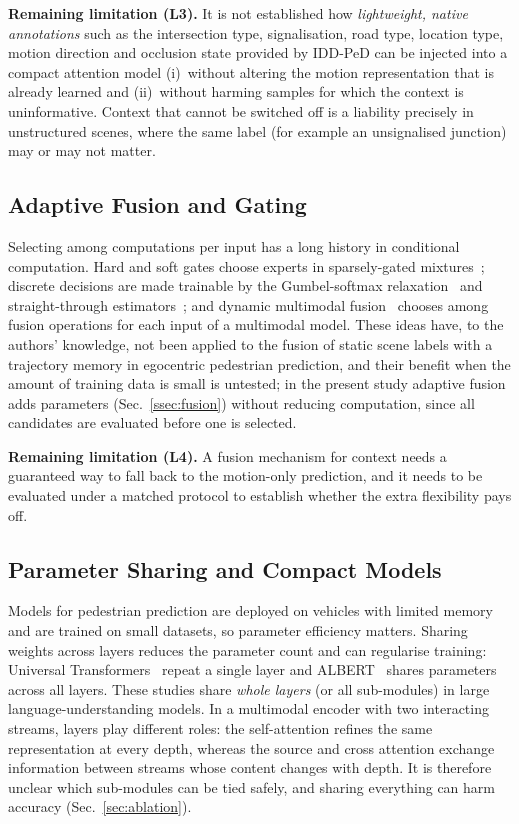 \textbf{Remaining limitation (L3).} It is not established how \emph{lightweight, native annotations} such as the intersection type, signalisation, road type, location type, motion direction and occlusion state provided by IDD-PeD can be injected into a compact attention model (i)~without altering the motion representation that is already learned and (ii)~without harming samples for which the context is uninformative. Context that cannot be switched off is a liability precisely in unstructured scenes, where the same label (for example an unsignalised junction) may or may not matter.

\subsection{Adaptive Fusion and Gating}
Selecting among computations per input has a long history in conditional computation. Hard and soft gates choose experts in sparsely-gated mixtures~\citep{shazeer2017moe}; discrete decisions are made trainable by the Gumbel-softmax relaxation~\citep{jang2017gumbel} and straight-through estimators~\citep{bengio2013ste}; and dynamic multimodal fusion~\citep{xue2022dynmm} chooses among fusion operations for each input of a multimodal model. These ideas have, to the authors' knowledge, not been applied to the fusion of static scene labels with a trajectory memory in egocentric pedestrian prediction, and their benefit when the amount of training data is small is untested; in the present study adaptive fusion adds parameters (Sec.~\ref{ssec:fusion}) without reducing computation, since all candidates are evaluated before one is selected.

\textbf{Remaining limitation (L4).} A fusion mechanism for context needs a guaranteed way to fall back to the motion-only prediction, and it needs to be evaluated under a matched protocol to establish whether the extra flexibility pays off.

\subsection{Parameter Sharing and Compact Models}
Models for pedestrian prediction are deployed on vehicles with limited memory and are trained on small datasets, so parameter efficiency matters. Sharing weights across layers reduces the parameter count and can regularise training: Universal Transformers~\citep{dehghani2019universal} repeat a single layer and ALBERT~\citep{lan2020albert} shares parameters across all layers. These studies share \emph{whole layers} (or all sub-modules) in large language-understanding models. In a multimodal encoder with two interacting streams, layers play different roles: the self-attention refines the same representation at every depth, whereas the source and cross attention exchange information between streams whose content changes with depth. It is therefore unclear which sub-modules can be tied safely, and sharing everything can harm accuracy (Sec.~\ref{sec:ablation}).

